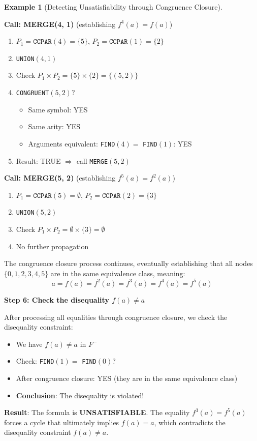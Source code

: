\documentclass[11pt,a4paper]{article}
\theoremstyle{definition}
\newtheorem{example}{Example}[section]
\theoremstyle{plain}
\theoremstyle{remark}
\begin{document}
\begin{example}[Detecting Unsatisfiability through Congruence Closure]
\begin{tcolorbox}[colback=green!5!white,colframe=green!75!black,title=\textbf{Execution Trace}]
\textbf{Call: MERGE(4, 1)} (establishing $f^4(a) = f(a)$)

\begin{enumerate}
    \item $P_1 = \texttt{CCPAR}(4) = \{5\}$, $P_2 = \texttt{CCPAR}(1) = \{2\}$
    \item \texttt{UNION}$(4, 1)$
    \item Check $P_1 \times P_2 = \{5\} \times \{2\} = \{(5, 2)\}$
    \item \texttt{CONGRUENT}$(5, 2)$?
    \begin{itemize}
        \item Same symbol: YES
        \item Same arity: YES
        \item Arguments equivalent: \texttt{FIND}$(4) = $ \texttt{FIND}$(1)$: YES
    \end{itemize}
    \item Result: TRUE $\Rightarrow$ call \texttt{MERGE}$(5, 2)$
\end{enumerate}

\textbf{Call: MERGE(5, 2)} (establishing $f^5(a) = f^2(a)$)

\begin{enumerate}
    \item $P_1 = \texttt{CCPAR}(5) = \emptyset$, $P_2 = \texttt{CCPAR}(2) = \{3\}$
    \item \texttt{UNION}$(5, 2)$
    \item Check $P_1 \times P_2 = \emptyset \times \{3\} = \emptyset$
    \item No further propagation
\end{enumerate}

The congruence closure process continues, eventually establishing that all nodes $\{0, 1, 2, 3, 4, 5\}$ are in the same equivalence class, meaning:
\[
a = f(a) = f^2(a) = f^3(a) = f^4(a) = f^5(a)
\]
\end{tcolorbox}

\textbf{Step 6: Check the disequality $f(a) \neq a$}

After processing all equalities through congruence closure, we check the disequality constraint:
\begin{itemize}
    \item We have $f(a) \neq a$ in $F^-$
    \item Check: \texttt{FIND}$(1) = $ \texttt{FIND}$(0)$?
    \item After congruence closure: YES (they are in the same equivalence class)
    \item \textbf{Conclusion}: The disequality is violated!
\end{itemize}

\textbf{Result}: The formula is \textbf{UNSATISFIABLE}. The equality $f^3(a) = f^5(a)$ forces a cycle that ultimately implies $f(a) = a$, which contradicts the disequality constraint $f(a) \neq a$.
\end{example} 
\end{document}
